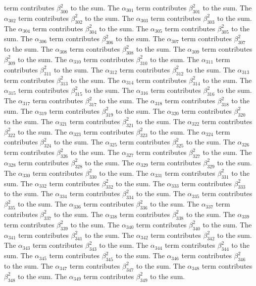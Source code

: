 \begin{lemma}
term contributes $\beta_{300}^{2}$ to the sum. The $\alpha_{301}$ term contributes $\beta_{301}^{2}$ to the sum. The $\alpha_{302}$ term contributes $\beta_{302}^{2}$ to the sum. The $\alpha_{303}$ term contributes $\beta_{303}^{2}$ to the sum. The $\alpha_{304}$ term contributes $\beta_{304}^{2}$ to the sum. The $\alpha_{305}$ term contributes $\beta_{305}^{2}$ to the sum. The $\alpha_{306}$ term contributes $\beta_{306}^{2}$ to the sum. The $\alpha_{307}$ term contributes $\beta_{307}^{2}$ to the sum. The $\alpha_{308}$ term contributes $\beta_{308}^{2}$ to the sum. The $\alpha_{309}$ term contributes $\beta_{309}^{2}$ to the sum. The $\alpha_{310}$ term contributes $\beta_{310}^{2}$ to the sum. The $\alpha_{311}$ term contributes $\beta_{311}^{2}$ to the sum. The $\alpha_{312}$ term contributes $\beta_{312}^{2}$ to the sum. The $\alpha_{313}$ term contributes $\beta_{313}^{2}$ to the sum. The $\alpha_{314}$ term contributes $\beta_{314}^{2}$ to the sum. The $\alpha_{315}$ term contributes $\beta_{315}^{2}$ to the sum. The $\alpha_{316}$ term contributes $\beta_{316}^{2}$ to the sum. The $\alpha_{317}$ term contributes $\beta_{317}^{2}$ to the sum. The $\alpha_{318}$ term contributes $\beta_{318}^{2}$ to the sum. The $\alpha_{319}$ term contributes $\beta_{319}^{2}$ to the sum. The $\alpha_{320}$ term contributes $\beta_{320}^{2}$ to the sum. The $\alpha_{321}$ term contributes $\beta_{321}^{2}$ to the sum. The $\alpha_{322}$ term contributes $\beta_{322}^{2}$ to the sum. The $\alpha_{323}$ term contributes $\beta_{323}^{2}$ to the sum. The $\alpha_{324}$ term contributes $\beta_{324}^{2}$ to the sum. The $\alpha_{325}$ term contributes $\beta_{325}^{2}$ to the sum. The $\alpha_{326}$ term contributes $\beta_{326}^{2}$ to the sum. The $\alpha_{327}$ term contributes $\beta_{327}^{2}$ to the sum. The $\alpha_{328}$ term contributes $\beta_{328}^{2}$ to the sum. The $\alpha_{329}$ term contributes $\beta_{329}^{2}$ to the sum. The $\alpha_{330}$ term contributes $\beta_{330}^{2}$ to the sum. The $\alpha_{331}$ term contributes $\beta_{331}^{2}$ to the sum. The $\alpha_{332}$ term contributes $\beta_{332}^{2}$ to the sum. The $\alpha_{333}$ term contributes $\beta_{333}^{2}$ to the sum. The $\alpha_{334}$ term contributes $\beta_{334}^{2}$ to the sum. The $\alpha_{335}$ term contributes $\beta_{335}^{2}$ to the sum. The $\alpha_{336}$ term contributes $\beta_{336}^{2}$ to the sum. The $\alpha_{337}$ term contributes $\beta_{337}^{2}$ to the sum. The $\alpha_{338}$ term contributes $\beta_{338}^{2}$ to the sum. The $\alpha_{339}$ term contributes $\beta_{339}^{2}$ to the sum. The $\alpha_{340}$ term contributes $\beta_{340}^{2}$ to the sum. The $\alpha_{341}$ term contributes $\beta_{341}^{2}$ to the sum. The $\alpha_{342}$ term contributes $\beta_{342}^{2}$ to the sum. The $\alpha_{343}$ term contributes $\beta_{343}^{2}$ to the sum. The $\alpha_{344}$ term contributes $\beta_{344}^{2}$ to the sum. The $\alpha_{345}$ term contributes $\beta_{345}^{2}$ to the sum. The $\alpha_{346}$ term contributes $\beta_{346}^{2}$ to the sum. The $\alpha_{347}$ term contributes $\beta_{347}^{2}$ to the sum. The $\alpha_{348}$ term contributes $\beta_{348}^{2}$ to the sum. The $\alpha_{349}$ term contributes $\beta_{349}^{2}$ to the sum. 
\end{lemma}
